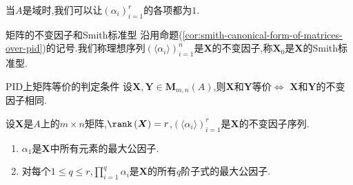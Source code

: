 \begin{remark}{}{}
	当$A$是域时,我们可以让$\left(\alpha_{i}\right)_{i=1}^{r}$的各项都为$1$.
\end{remark}

\begin{definition}{矩阵的不变因子和Smith标准型}{}
	沿用命题(\ref{cor:smith-canonical-form-of-matrices-over-pid})的记号.我们称理想序列$\left(\langle\alpha_{i}\rangle\right)_{i=1}^{n}$是$\boldsymbol{X}$的不变因子,称$\boldsymbol{X}_{0}$是$\boldsymbol{X}$的Smith标准型.
\end{definition}

\begin{corollary}{PID上矩阵等价的判定条件}{}
	设$\boldsymbol{X},\boldsymbol{Y}\in\mathbf{M}_{m,n}\left(A\right)$,则$\boldsymbol{X}$和$\boldsymbol{Y}$等价$\iff$ $\boldsymbol{X}$和$\boldsymbol{Y}$的不变因子相同.
\end{corollary}

\begin{proposition}{}{}
	设$\boldsymbol{X}$是$A$上的$m\times n$矩阵,$\rank\left(\boldsymbol{X}\right)=r$,$\left(\langle\alpha_{i}\rangle\right)_{i=1}^{r}$是$\boldsymbol{X}$的不变因子序列.
	\begin{enumerate}
		\item $\alpha_{1}$是$\boldsymbol{X}$中所有元素的最大公因子.
		\item 对每个$1\leq q\leq r$,$\prod\limits_{i=1}^{q}\alpha_{i}$是$\boldsymbol{X}$的所有$q$阶子式的最大公因子.
	\end{enumerate}
\end{proposition}














